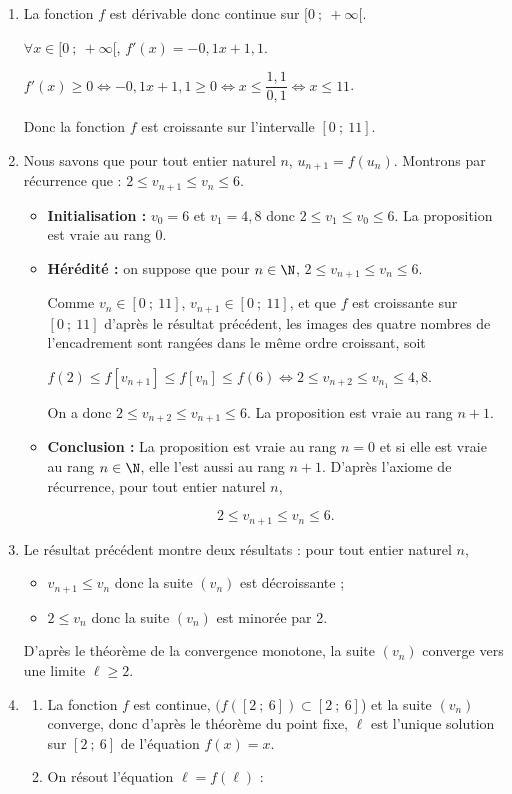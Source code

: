 \begin{enumerate}[resume]
	\item La fonction $f$ est dérivable donc continue sur $[0~;~+\infty[$.
	
$\forall x \in [0~;~+\infty[$, $f'(x) = -0,1x + 1,1$.
	
$f'(x)\geqslant 0 \iff -0,1x + 1,1\geqslant 0 \iff x\leqslant \dfrac{1,1}{0,1} \iff x \leqslant 11$.
	
Donc la fonction $f$ est croissante sur l'intervalle $[0~;~11]$.
	\item Nous savons que pour tout entier naturel $n$, $u_{n+1}=f(u_n)$. Montrons par récurrence que : $2 \leqslant v_{n+1} \leqslant v_n \leqslant 6$.
	\begin{itemize}
		\item\textbf{Initialisation :} $v_0 = 6$ et $v_1 = 4,8$ donc $2 \leqslant v_{1} \leqslant v_0 \leqslant 6$. La proposition est vraie au rang $0$.
		\item\textbf{Hérédité :} on suppose que pour $n \in \N$,\: $2 \leqslant v_{n+1} \leqslant v_n \leqslant 6$.

Comme $v_{n}\in [0~;~11]$, $v_{n+1}\in [0~;~11]$, et que $f$ est croissante sur $[0~;~11]$ d'après le résultat précédent, les images des quatre nombres de l'encadrement sont rangées dans le même ordre croissant, soit 

$f(2) \leqslant f[v_{n+1}] \leqslant f[v_{n}] \leqslant f(6) \iff 2 \leqslant v_{n+2} \leqslant v_{n_1} \leqslant 4,8$.

On a donc $2 \leqslant v_{n+2} \leqslant v_{n+1}  \leqslant 6$. La proposition est vraie au rang $n + 1$.
		\item \textbf{Conclusion :} La proposition est vraie au rang $n = 0$ et si elle est vraie au rang $n \in \N$, elle l'est aussi au rang $n + 1$. D'après l'axiome de récurrence, pour tout entier naturel $n$,
	
\[2 \leqslant v_{n+1} \leqslant v_n \leqslant 6.\]
	\end{itemize}
\item Le résultat précédent montre deux résultats : pour tout entier naturel $n$,
\begin{itemize}
	\item $v_{n+1} \leqslant v_n$ donc la suite $(v_n)$ est décroissante ;
	\item $2 \leqslant v_{n}$ donc la suite $(v_n)$ est minorée par 2.
	\end{itemize}
	
D'après le théorème de la convergence monotone, la suite $(v_n)$ converge vers une limite $\ell \geqslant 2$.
	\item \begin{enumerate}
		\item La fonction $f$ est continue,  $(f\left([2~;~6]\right) \subset [2~;~6]$) et la suite $(v_n)$ converge, donc d'après le théorème du point fixe, $\ell$ est l'unique solution sur $[2~;~6]$ de l'équation $f(x) = x$.
		\item On résout l'équation $\ell=f(\ell)$ :
		

\end{enumerate}
\end{enumerate}
